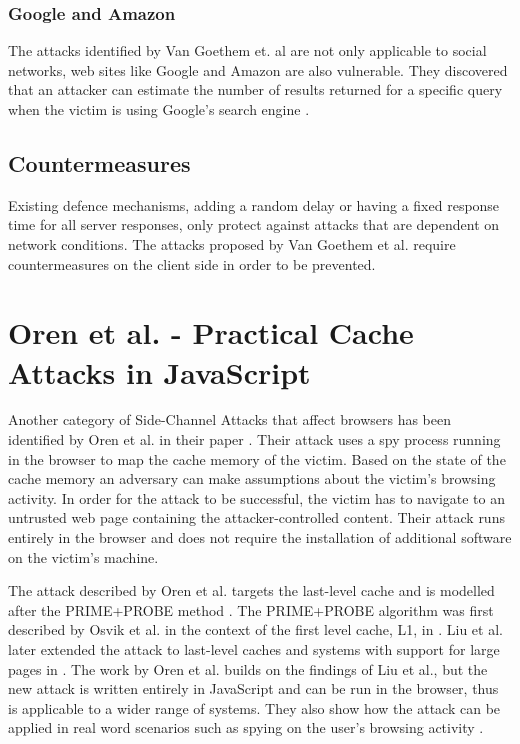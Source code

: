 \documentclass[10pt,a4paper,twoside]{book}
\begin{document}
\subsubsection{Google and Amazon}
The attacks identified by Van Goethem et. al are not only applicable to social networks, web sites like Google and Amazon are also vulnerable. They discovered that an attacker can estimate the number of results returned for a specific query when the victim is using Google's search engine \cite{van2015clock}. 

\subsection{Countermeasures}

Existing defence mechanisms, adding a random delay or having a fixed response time for all server responses, only protect against attacks that are dependent on network conditions. The attacks proposed by Van Goethem et al. require countermeasures on the client side in order to be prevented.


\section{Oren et al. - Practical Cache Attacks in JavaScript}
\label{orenetal}

Another category of Side-Channel Attacks that affect browsers has been identified by Oren et al. in their paper \cite{oren2015spy}. Their attack uses a spy process running in the browser to map the cache memory of the victim. Based on the state of the cache memory an adversary can make assumptions about the victim's browsing activity. In order for the attack to be successful, the victim has to navigate to an untrusted web page containing the attacker-controlled content. Their attack runs entirely in the browser and does not require the installation of additional software on the victim's machine.

The attack described by Oren et al. targets the last-level cache and is modelled after the PRIME+PROBE method \cite{oren2015spy}. The PRIME+PROBE algorithm was first described by Osvik et al. in the context of the first level cache, L1, in \cite{osvik2006cache}. Liu et al. later extended the attack to last-level caches and systems with support for large pages in \cite{liu2015last}. The work by Oren et al. builds on the findings of Liu et al., but the new attack is written entirely in JavaScript and can be run in the browser, thus is applicable to a wider range of systems. They also show how the attack can be applied in real word scenarios such as spying on the user's browsing activity \cite{oren2015spy}.
\end{document}
